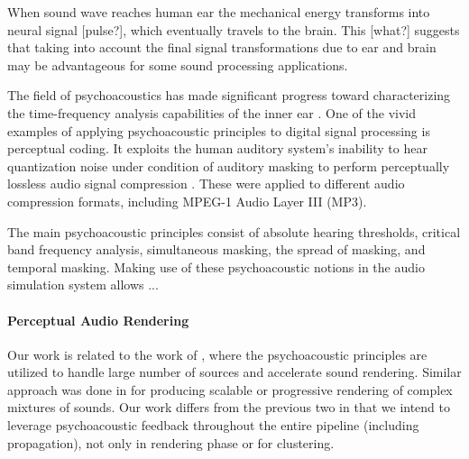 When sound wave reaches human ear the mechanical energy transforms into neural signal [pulse?], which eventually travels to the brain. This [what?] suggests that taking into account the final signal transformations due to ear and brain may be advantageous for some sound processing applications.

The field of psychoacoustics has made significant progress toward characterizing the time-frequency analysis capabilities of the inner ear \cite{painter2000perceptual}. One of the vivid examples of applying psychoacoustic principles to digital signal processing is perceptual coding. It exploits the human auditory system's inability to hear quantization noise under condition of auditory masking \cite{pan1995tutorial} to perform perceptually lossless audio signal compression \cite{ambikairajah1997auditory}. These were applied to different audio compression formats, including MPEG-1 Audio Layer III (MP3).

The main psychoacoustic principles consist of absolute hearing thresholds, critical band frequency analysis, simultaneous masking, the spread of masking, and temporal masking. Making use of these psychoacoustic notions in the audio simulation system allows ...  



\paragraph{Perceptual Audio Rendering} 

Our work is related to the work of \cite{tsingos2004perceptual}, where the psychoacoustic principles are utilized to handle large number of sources and accelerate sound rendering.
Similar approach was done in \cite{moeck2007progressive} for producing scalable or progressive rendering of complex mixtures of sounds.
Our work differs from the previous two in that we intend to leverage psychoacoustic feedback throughout the entire pipeline (including propagation), not only in rendering phase or for clustering.


